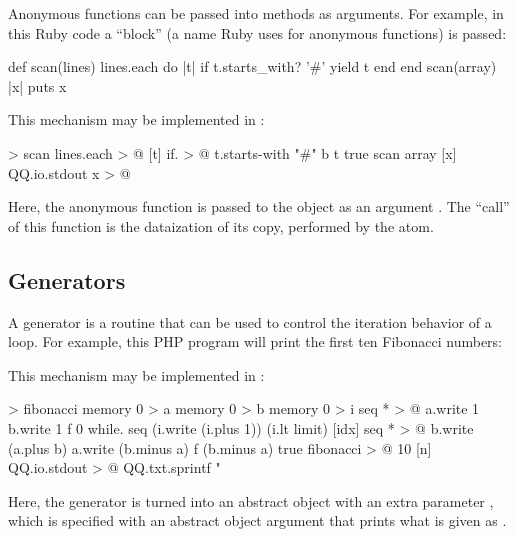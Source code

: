 \documentclass[sigplan,nonacm]{acmart}
\begin{document}
Anonymous functions can be passed into methods as arguments. For example, in this Ruby code a ``block'' (a name Ruby uses for anonymous functions) is passed:

\begin{ffcode}
def scan(lines)
  lines.each do |t|
    if t.starts_with? '#' yield t
  end
end
scan(array) { |x| puts x }
\end{ffcode}

This mechanism may be implemented in \eolang{}:

\begin{ffcode}
[lines b] > scan
  lines.each > @
    [t]
      if. > @
        t.starts-with "#"
        b t
        true
scan
  array
  [x]
    QQ.io.stdout x > @
\end{ffcode}

Here, the anonymous function is passed to the object  as an argument . The ``call'' of this function is the dataization of its copy, performed by the  atom.

\subsection{Generators}
\label{sec:generators}

A generator is a routine that can be used to control the iteration behavior of a loop.
For example, this PHP program will print the first ten Fibonacci numbers:


This mechanism may be implemented in \eolang{}:

\begin{ffcode}
[limit f] > fibonacci
  memory 0 > a
  memory 0 > b
  memory 0 > i
  seq * > @
    a.write 1
    b.write 1
    f 0
    while.
      seq (i.write (i.plus 1)) (i.lt limit)
      [idx]
        seq * > @
          b.write (a.plus b)
          a.write (b.minus a)
          f (b.minus a)
    true
fibonacci > @
  10
  [n]
    QQ.io.stdout > @
      QQ.txt.sprintf "%
\end{ffcode}

Here, the generator is turned into an abstract object  with an extra parameter , which is specified with an abstract object argument that prints what is given as .
\end{document}
